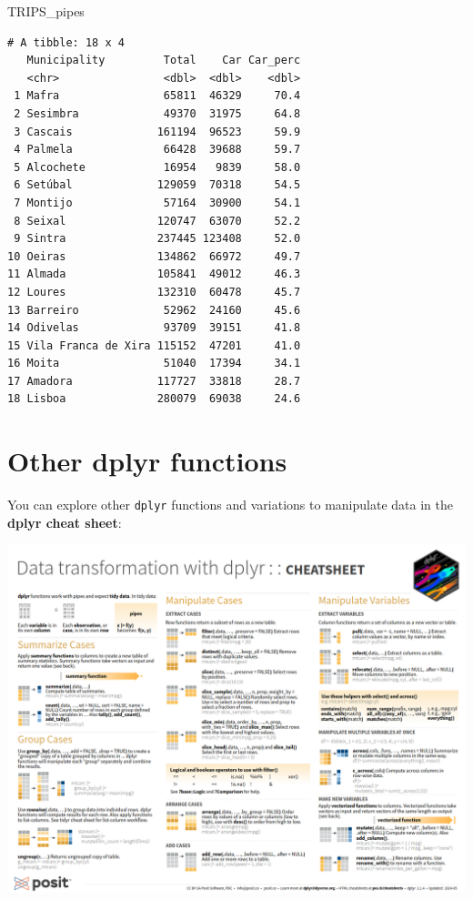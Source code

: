 \documentclass[
  letterpaper,
  DIV=11,
  numbers=noendperiod]{scrreprt}
\newenvironment{Shaded}{\begin{snugshade}}{\end{snugshade}}
\newcommand{\NormalTok}[1]{\textcolor[rgb]{0.00,0.23,0.31}{#1}}
\begin{document}
\begin{Shaded}
\begin{Highlighting}[]
\NormalTok{TRIPS\_pipes}
\end{Highlighting}
\end{Shaded}

\begin{verbatim}
# A tibble: 18 x 4
   Municipality         Total    Car Car_perc
   <chr>                <dbl>  <dbl>    <dbl>
 1 Mafra                65811  46329     70.4
 2 Sesimbra             49370  31975     64.8
 3 Cascais             161194  96523     59.9
 4 Palmela              66428  39688     59.7
 5 Alcochete            16954   9839     58.0
 6 Setúbal             129059  70318     54.5
 7 Montijo              57164  30900     54.1
 8 Seixal              120747  63070     52.2
 9 Sintra              237445 123408     52.0
10 Oeiras              134862  66972     49.7
11 Almada              105841  49012     46.3
12 Loures              132310  60478     45.7
13 Barreiro             52962  24160     45.6
14 Odivelas             93709  39151     41.8
15 Vila Franca de Xira 115152  47201     41.0
16 Moita                51040  17394     34.1
17 Amadora             117727  33818     28.7
18 Lisboa              280079  69038     24.6
\end{verbatim}

\section{Other dplyr functions}\label{other-dplyr-functions}

You can explore other \texttt{dplyr} functions and variations to
manipulate data in the \textbf{dplyr cheat sheet}:

\href{https://rstudio.github.io/cheatsheets/data-transformation.pdf}{\includegraphics{images/clipboard-2101323289.png}}
\end{document}
